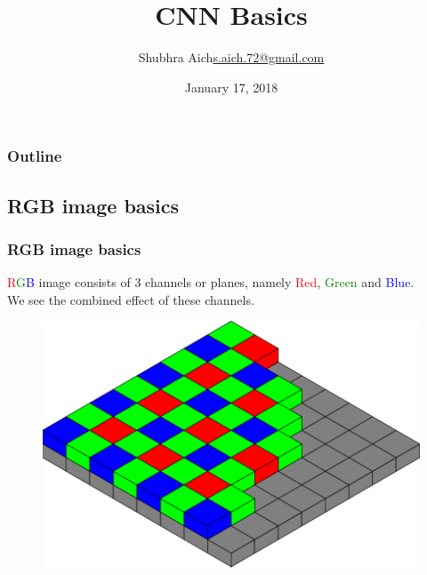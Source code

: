\documentclass{beamer}
\title[Short Paper Title]{CNN Basics}
\subtitle{}
\institute{}
\author{\texorpdfstring{Shubhra Aich\newline\url{s.aich.72@gmail.com}}{Shubhra Aich}}
\date{January 17, 2018}
\begin{document}
\begin{frame}
  \titlepage
\end{frame}

\begin{frame}
  \frametitle{Outline}
  \tableofcontents
\end{frame}


\subsection{RGB image basics}
\begin{frame}
	\frametitle{RGB image basics}
	\begin{minipage}{0.45\textwidth}	 		
	\textcolor{red}{R}\textcolor{green}{G}\textcolor{blue}{B} image consists of 3 channels or planes, namely \textcolor{red}{Red}, \textcolor{green}{Green} and \textcolor{blue}{Blue}. \\
	We see the combined effect of these channels.
	\end{minipage}	
	\begin{minipage}{0.45\textwidth}
		\hspace{1em}	
		\begin{figure}
	\includegraphics[scale=0.12]{./figures/edit/bayer_sensor.png} 				
	\end{figure}
			

\end{minipage}
\end{frame}
\end{document}

